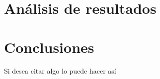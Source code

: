 \documentclass[12pt,letterpaper]{report}
\begin{document}
\section{Análisis de resultados}

\section{Conclusiones}

Si desea citar algo lo puede hacer así \cite{margolis2020arduino}


\appendix







\end{document}
